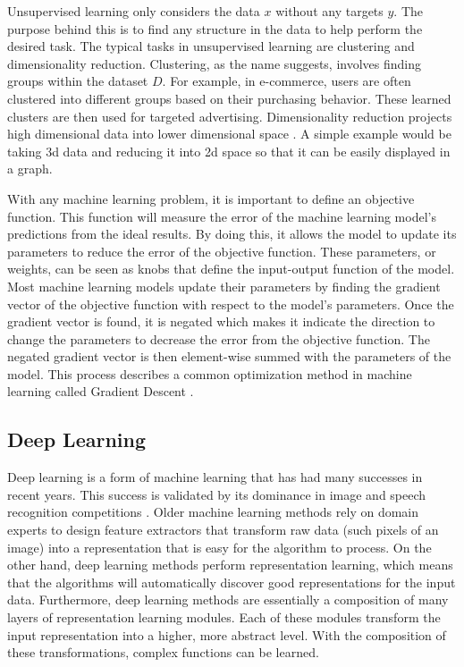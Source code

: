 Unsupervised learning only considers the data $x$ without any targets $y$. The purpose behind this is to find any structure in the data to help perform the desired task. The typical tasks in unsupervised learning are clustering and dimensionality reduction. Clustering, as the name suggests, involves finding groups within the dataset $D$. For example, in e-commerce, users are often clustered into different groups based on their purchasing behavior. These learned clusters are then used for targeted advertising. Dimensionality reduction projects high dimensional data into lower dimensional space \cite{Murphy}. A simple example would be taking 3d data and reducing it into 2d space so that it can be easily displayed in a graph.

With any machine learning problem, it is important to define an objective function. This function will measure the error of the machine learning model's predictions from the ideal results. By doing this, it allows the model to update its parameters to reduce the error of the objective function. These parameters, or weights, can be seen as knobs that define the input-output function of the model. Most machine learning models update their parameters by finding the gradient vector of the objective function with respect to the model's parameters. Once the gradient vector is found, it is negated which makes it indicate the direction to change the parameters to decrease the error from the objective function. The negated gradient vector is then element-wise summed with the parameters of the model. This process describes a common optimization method in machine learning called Gradient Descent \cite{Nature_DL}. 

\subsection{Deep Learning}

Deep learning is a form of machine learning that has had many successes in recent years. This success is validated by its dominance in image and speech recognition competitions \cite{Nature_DL}. Older machine learning methods rely on domain experts to design feature extractors that transform raw data (such pixels of an image) into a representation that is easy for the algorithm to process. On the other hand, deep learning methods perform representation learning, which means that the algorithms will automatically discover good representations for the input data. Furthermore, deep learning methods are essentially a composition of many layers of representation learning modules. Each of these modules transform the input representation into a higher, more abstract level. With the composition of these transformations, complex functions can be learned.

